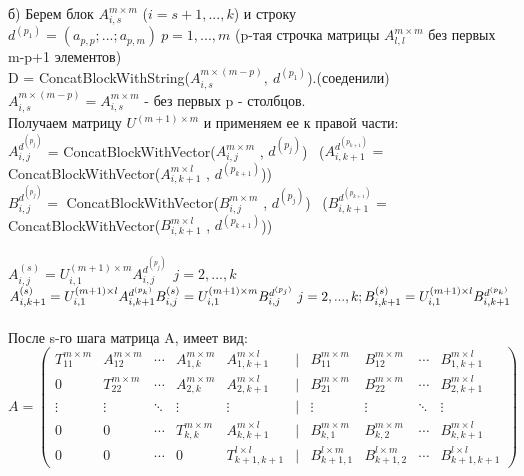 \documentclass[a4paper,12pt]{article}
\begin{document}
б) Берем блок $A_{i,s}^{{m\times m}}$ ($i = s+1,...,k$) и строку $d^{(p_{1})} =(a_{p,p};...;a_{p,m}) \ p = 1,...,m$ (p-тая строчка матрицы $A_{l,l}^{m\times m}$ без первых m-p+1 элементов) \\
D = ConcatBlockWithString($A_{i,s}^{{m\times (m-p)}}, \ d^{(p_{1})}$).(соеденили) \
$A_{i,s}^{m\times (m-p)} = A_{i,s}^{m\times m}$ - без первых p - столбцов.\\
Получаем матрицу $U^{(m+1)\times m}$ и применяем ее к правой части:\\
$A_{i,j}^{d^{(p_{j})}}$ =  ConcatBlockWithVector($A_{i,j}^{m\times m}$ , $d^{(p_{j})}$) \ ($A_{i,k+1}^{d^{(p_{k+1})}} = $   ConcatBlockWithVector($A_{i,k+1}^{m\times l}$ , $d^{(p_{k+1})}$)) \\

$B_{i,j}^{d^{(p_{j})}} = $ ConcatBlockWithVector($B_{i,j}^{m\times m}$ , $d^{(p_{j})}$) \ 
($B_{i,k+1}^{d^{(p_{k+1})}} = $   ConcatBlockWithVector($B_{i,k+1}^{m\times l}$ , $d^{(p_{k+1})}$))\\\\
$A_{i,j}^{(s)} = U_{i,1}^{(m+1)\times m} A_{i,j}^{d^{(p_{j})}} \ \ j = 2,...,k$ $A_{i,k+1}^{(s)} = U_{i,1}^{(m+1)\times l} A_{i, k+1}^{d^{(p_{k})}} \\ B_{i,j}^{(s)} = U_{i,1}^{(m+1)\times m} B_{i,j}^{d^{(p_{j})}} \  j = 2,...,k ;  B_{i,k+1}^{(s)} = U_{i,1}^{(m+1)\times l} B_{i, k+1}^{d^{(p_{k})}} $\\\\

После s-го шага матрица A, имеет вид:
\begin{equation}
A=
  \begin{pmatrix} 
    T_{11}^{m \times m} & A_{12}^{m \times m} & \cdots & A_{1,k}^{m \times m} & A_{1,k+1}^{m \times l} & | & B_{11}^{m \times m} &  B_{12}^{m \times m} & \cdots & B_{1,k+1}^{m \times l}\\
    0 & T_{22}^{m \times m} & \cdots & A_{2,k}^{m \times m} & A_{2,k+1}^{m \times l} & | & B_{21}^{m \times m} &  B_{22}^{m \times m} & \cdots & B_{2,k+1}^{m \times l}\\
    \vdots & \vdots & \ddots & \vdots & \vdots & | & \vdots & \vdots & \ddots & \vdots\\ 
    0 & 0 & \cdots & T_{k,k}^{m \times m} & A_{k,k+1}^{m \times l} & | & B_{k,1}^{m \times m} &  B_{k,2}^{m \times m} & \cdots & B_{k,k+1}^{m \times l}\\
    0 & 0 & \cdots & 0 & T_{k+1,k+1}^{l \times l} & | & B_{k+1,1}^{l \times m} &  B_{k+1,2}^{l \times m} & \cdots & B_{k+1,k+1}^{l \times l} 
  \end{pmatrix}
\end{equation}
\end{document}
